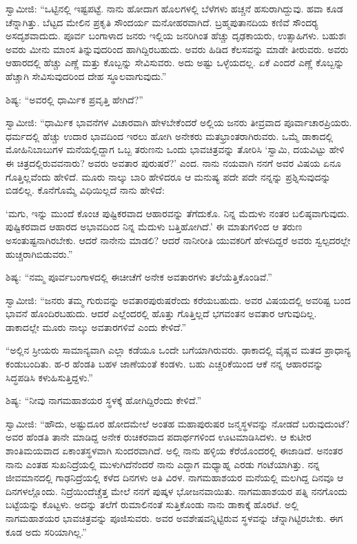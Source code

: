  ಸ್ವಾಮೀಜಿ: “ಒಟ್ಟಿನಲ್ಲಿ ಇಷ್ಟಪಟ್ಟೆ. ನಾನು ಹೋದಾಗ ಹೊಲಗಳಲ್ಲಿ ಬೆಳೆಗಳು ಹಚ್ಚನೆ ಹಸುರಾಗಿದ್ದುವು. ಹವಾ ಕೂಡ ಚೆನ್ನಾಗಿತ್ತು. ಬೆಟ್ಟದ ಮೇಲಿನ ಪ್ರಕೃತಿ ಸೌಂದರ್ಯ ಮನೋಹರವಾಗಿದೆ. ಬ್ರಹ್ಮಪುತಾನದಿಯ ಕಣಿವೆ ಸೌಂದರ‍್ಯ ಅಸದೃಶವಾದುದು. ಪೂರ್ವ ಬಂಗಾಳಾದ ಜನರು ಇಲ್ಲಿಯ ಜನರಿಗಿಂತ ಹೆಚ್ಚು ದೃಢಕಾಯರು, ಉತ್ಸಾಹಿಗಳು. ಬಹುಶಃ ಅವರು ಮೀನು ಮಾಂಸ ತಿನ್ನುವುದರಿಂದ ಹಾಗಿದ್ದಿರಬಹುದು. ಅವರು ಹಿಡಿದ ಕೆಲಸವನ್ನು ಮಾಡೇ ತೀರುವರು. ಅವರು ಆಹಾರದಲ್ಲಿ ಹೆಚ್ಚು ಎಣ್ಣೆ ಮತ್ತು ಕೊಬ್ಬನ್ನು ಸೇವಿಸುವರು. ಅದು ಅಷ್ಟು ಒಳ್ಳೆಯದಲ್ಲ. ಏಕೆ ಎಂದರೆ ಎಣ್ಣೆ ಕೊಬ್ಬನ್ನು ಹೆಚ್ಚಾಗಿ ಸೇವಿಸುವುದರಿಂದ ದೇಹ ಸ್ಥೂಲವಾಗುವುದು.” 

 ಶಿಷ್ಯ: “ಅವರಲ್ಲಿ ಧಾರ್ಮಿಕ ಪ್ರವೃತ್ತಿ ಹೇಗಿದೆ?” 

 ಸ್ವಾಮೀಜಿ: “ಧಾರ್ಮಿಕ ಭಾವನೆಗಳ ವಿಚಾರವಾಗಿ ಹೇಳಬೇಕೆಂದರೆ ಅಲ್ಲಿಯ ಜನರು ತೀವ್ರವಾದ ಪೂರ್ವಾಚಾರಪ್ರಿಯರು. ಧರ್ಮದಲ್ಲಿ ಹೆಚ್ಚು ಉದಾರ ಭಾವದಿಂದ ಇರಲು ಹೋಗಿ ಅನೇಕರು ಮತಭ್ರಾಂತರಾಗಿರುವರು. ಒಮ್ಮೆ ಡಾಕಾದಲ್ಲಿ ಮೋಹಿನಿಬಾಬುಗಳ ಮನೆಯಲ್ಲಿದ್ದಾಗ ಒಬ್ಬ ತರುಣನು ಒಂದು ಭಾವಚಿತ್ರವನ್ನು ತೋರಿಸಿ ‘ಸ್ವಾಮಿ, ದಯವಿಟ್ಟು ಹೇಳಿ ಈ ಚಿತ್ರದಲ್ಲಿರುವವನಾರು? ಅವರು ಅವತಾರ ಪುರುಷರೆ?’ ಎಂದ. ನಾನು ನಯವಾಗಿ ನನಗೆ ಅವರ ವಿಷಯ ಏನೂ ಗೊತ್ತಿಲ್ಲವೆಂದು ಹೇಳಿದೆ. ಮೂರು ನಾಲ್ಕು ಬಾರಿ ಹೇಳಿದರೂ ಆ ಮನುಷ್ಯ ಪದೇ ಪದೇ ನನ್ನನ್ನು ಪ್ರಶ್ನಿಸುವುದನ್ನು ಬಿಡಲಿಲ್ಲ. ಕೊನೆಗೊಮ್ಮೆ ವಿಧಿಯಿಲ್ಲದೆ ನಾನು ಹೇಳಿದೆ: 

 ‘ಮಗು, ಇನ್ನು ಮುಂದೆ ಕೊಂಚ ಪುಷ್ಟಿಕರವಾದ ಆಹಾರವನ್ನು ತೆಗೆದುಕೊ. ನಿನ್ನ ಮೆದುಳು ನಂತರ ಬಲಿಷ್ಠವಾಗುವುದು. ಪುಷ್ಟಿಕರವಾದ ಆಹಾರದ ಅಭಾವದಿಂದ ನಿನ್ನ ಮೆದುಳು ಬತ್ತಿಹೋಗಿದೆ.’ ಈ ಮಾತುಗಳಿಂದ ಆ ತರುಣ ಅಸಂತುಷ್ಟನಾಗಿರಬೇಕು. ಆದರೆ ನಾನೇನು ಮಾಡಲಿ? ಆದರೆ ನಾನೀರೀತಿ ಯುವಕರಿಗೆ ಹೇಳದಿದ್ದರೆ ಅವರು ಸ್ವಲ್ಪದರಲ್ಲೇ ಹುಚ್ಚರಾಗಿಬಿಡುವರು.” 

 ಶಿಷ್ಯ: “ನಮ್ಮ ಪೂರ್ವಬಂಗಾಳದಲ್ಲಿ ಈಚೀಚೆಗೆ ಅನೇಕ ಅವತಾರಗಳು ತಲೆಯೆತ್ತಿಕೊಂಡಿವೆ.” 

 ಸ್ವಾಮೀಜಿ: “ಜನರು ತಮ್ಮ ಗುರುವನ್ನು ಅವತಾರಪುರುಷರೆಂದು ಕರೆಯಬಹುದು. ಅವರ ವಿಷಯದಲ್ಲಿ ಅವರಿಷ್ಟ ಬಂದ ಭಾವನೆ ಹೊಂದಿರಬಹುದು. ಆದರೆ ಎಲ್ಲೆಂದರಲ್ಲಿ ಹೊತ್ತು ಗೊತ್ತಿಲ್ಲದೆ ಭಗವಂತನ ಅವತಾರ ಆಗುವುದಿಲ್ಲ. ಡಾಕಾದಲ್ಲೇ ಮೂರು ನಾಲ್ಕು ಅವತಾರಗಳಿವೆ ಎಂದು ಕೇಳಿದೆ.” 

 “ಅಲ್ಲಿನ ಸ್ರೀಯರು ಸಾಮಾನ್ಯವಾಗಿ ಎಲ್ಲಾ ಕಡೆಯೂ ಒಂದೇ ಬಗೆಯಾಗಿರುವರು. ಢಾಕಾದಲ್ಲಿ ವೈಷ್ಣವ ಮತದ ಪ್ರಾಧಾನ್ಯ ಕಂಡುಬಂದಿತು. ಹ-ರ ಹೆಂಡತಿ ಬಹಳ ಜಾಣೆಯಂತೆ ಕಂಡಳು. ಬಹು ಎಚ್ಚರಿಕೆಯಿಂದ ಆಕೆ ನನ್ನ ಆಹಾರವನ್ನು ಸಿದ್ಧಪಡಿಸಿ ಕಳುಹಿಸುತ್ತಿದ್ದಳು.” 

 ಶಿಷ್ಯ: “ನೀವು ನಾಗಮಹಾಶಯರ ಸ್ಥಳಕ್ಕೆ ಹೋಗಿದ್ದಿರೆಂದು ಕೇಳಿದೆ.” 

 ಸ್ವಾಮೀಜಿ: “ಹೌದು, ಅಷ್ಟುದೂರ ಹೋದಮೇಲೆ ಅಂತಹ ಮಹಾಪುರುಷರ ಜನ್ಮಸ್ಥಳವನ್ನು ನೋಡದೆ ಬರುವುದುಂಟೆ? ಅವರ ಹೆಂಡತಿ ತಾನೇ ಮಾಡಿದ್ದ ಅನೇಕ ರುಚಿಕರವಾದ ಪದಾರ್ಥಗಳಿಂದ ಊಟಮಾಡಿಸಿದಳು. ಆ ಕುಟೀರ ಶಾಂತಿಮಯವಾದ ಏಕಾಂತಸ್ಥಳವಾಗಿ ಸುಂದರವಾಗಿದೆ. ಅಲ್ಲಿ ನಾನು ಹಳ್ಳಿಯ ಕೆರೆಯೊಂದರಲ್ಲಿ ಈಜಾಡಿದೆ. ಅನಂತರ ನಾನು ಎಂತಹ ಸುಖನಿದ್ರೆಯಲ್ಲಿ ಮುಳುಗಿದೆನೆಂದರೆ ನಾನು ಎದ್ದಾಗ ಮಧ್ಯಾಹ್ನ ಎರಡು ಗಂಟೆಯಾಗಿತ್ತು. ನನ್ನ ಜೀವಮಾನದಲ್ಲಿ ಗಾಢನಿದ್ರೆಯಲ್ಲಿ ಕಳೆದ ದಿನಗಳು ಅತಿ ವಿರಳ. ನಾಗಮಹಾಶಯರ ಮನೆಯಲ್ಲಿ ಮಲಗಿದ್ದ ದಿನವೂ ಆ ದಿನಗಳಲ್ಲೊಂದು. ನಿದ್ರೆಯಿಂದೆಚ್ಚೆತ್ತ ಮೇಲೆ ನನಗೆ ಪುಷ್ಕಳ ಭೋಜನವಾಯಿತು. ನಾಗಮಹಾಶಯರ ಪತ್ನಿ ನನಗೊಂದು ಬಟ್ಟೆಯನ್ನು ಕೊಟ್ಟಳು. ಅದನ್ನು ತಲೆಗೆ ರುಮಾಲಿನಂತೆ ಸುತ್ತಿಕೊಂಡು ನಾನು ಡಾಕಾಕ್ಕೆ ಹೊರಟೆ. ಅಲ್ಲಿ ನಾಗಮಹಾಶಯರ ಭಾವಚಿತ್ರವನ್ನು ಪೂಜಿಸುವರು. ಅವರ ಅವಶೇಷವನ್ನಿಟ್ಟಿರುವ ಸ್ಥಳವನ್ನು ಚೆನ್ನಾಗಿಟ್ಟಿರಬೇಕು. ಈಗ ಕೂಡ ಅದು ಸರಿಯಾಗಿಲ್ಲ.” 


